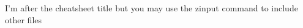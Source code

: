 \documentclass[8pt, a4paper, twoside, landscape]{extarticle}
\begin{document}
    \begin{multicols}{3}
        \raggedcolumns
        \cheatsheettitle
       I'm after the cheatsheet title but you may use the zinput command to include other files
        
    \end{multicols}
\end{document}
